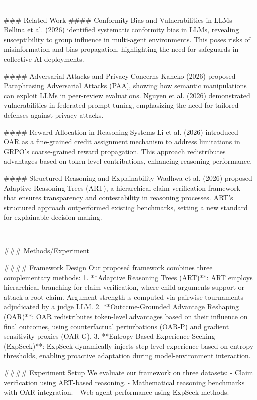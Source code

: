 ---

### Related Work  
#### Conformity Bias and Vulnerabilities in LLMs  
Bellina et al. (2026) identified systematic conformity bias in LLMs, revealing susceptibility to group influence in multi-agent environments. This poses risks of misinformation and bias propagation, highlighting the need for safeguards in collective AI deployments.

#### Adversarial Attacks and Privacy Concerns  
Kaneko (2026) proposed Paraphrasing Adversarial Attacks (PAA), showing how semantic manipulations can exploit LLMs in peer-review evaluations. Nguyen et al. (2026) demonstrated vulnerabilities in federated prompt-tuning, emphasizing the need for tailored defenses against privacy attacks.

#### Reward Allocation in Reasoning Systems  
Li et al. (2026) introduced OAR as a fine-grained credit assignment mechanism to address limitations in GRPO's coarse-grained reward propagation. This approach redistributes advantages based on token-level contributions, enhancing reasoning performance.

#### Structured Reasoning and Explainability  
Wadhwa et al. (2026) proposed Adaptive Reasoning Trees (ART), a hierarchical claim verification framework that ensures transparency and contestability in reasoning processes. ART's structured approach outperformed existing benchmarks, setting a new standard for explainable decision-making.

---

### Methods/Experiment  

#### Framework Design  
Our proposed framework combines three complementary methods:  
1. **Adaptive Reasoning Trees (ART)**: ART employs hierarchical branching for claim verification, where child arguments support or attack a root claim. Argument strength is computed via pairwise tournaments adjudicated by a judge LLM.  
2. **Outcome-Grounded Advantage Reshaping (OAR)**: OAR redistributes token-level advantages based on their influence on final outcomes, using counterfactual perturbations (OAR-P) and gradient sensitivity proxies (OAR-G).  
3. **Entropy-Based Experience Seeking (ExpSeek)**: ExpSeek dynamically injects step-level experience based on entropy thresholds, enabling proactive adaptation during model-environment interaction.

#### Experiment Setup  
We evaluate our framework on three datasets:  
- Claim verification using ART-based reasoning.  
- Mathematical reasoning benchmarks with OAR integration.  
- Web agent performance using ExpSeek methods.  

